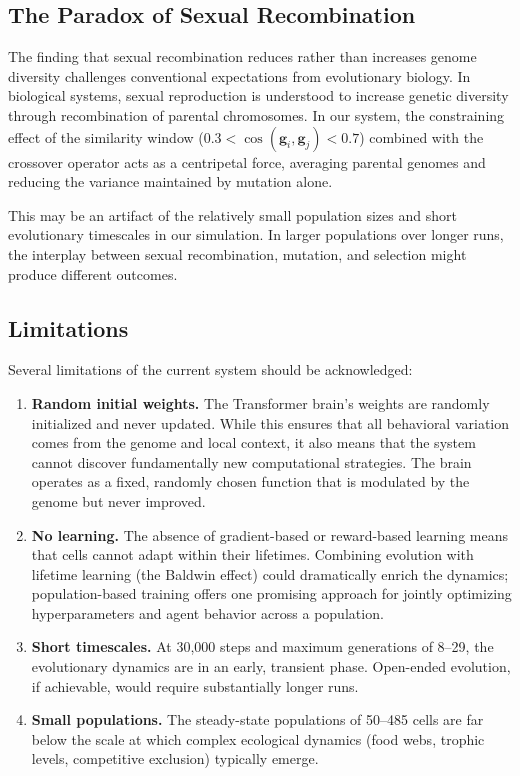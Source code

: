 \documentclass[10pt,twocolumn]{article}
\begin{document}
\subsection{The Paradox of Sexual Recombination}

The finding that sexual recombination reduces rather than increases genome diversity challenges conventional expectations from evolutionary biology.
In biological systems, sexual reproduction is understood to increase genetic diversity through recombination of parental chromosomes.
In our system, the constraining effect of the similarity window ($0.3 < \cos(\mathbf{g}_i, \mathbf{g}_j) < 0.7$) combined with the crossover operator acts as a centripetal force, averaging parental genomes and reducing the variance maintained by mutation alone.

This may be an artifact of the relatively small population sizes and short evolutionary timescales in our simulation.
In larger populations over longer runs, the interplay between sexual recombination, mutation, and selection might produce different outcomes.

\subsection{Limitations}

Several limitations of the current system should be acknowledged:

\begin{enumerate}
  \item \textbf{Random initial weights.} The Transformer brain's weights are randomly initialized and never updated.
  While this ensures that all behavioral variation comes from the genome and local context, it also means that the system cannot discover fundamentally new computational strategies.
  The brain operates as a fixed, randomly chosen function that is modulated by the genome but never improved.

  \item \textbf{No learning.} The absence of gradient-based or reward-based learning means that cells cannot adapt within their lifetimes.
  Combining evolution with lifetime learning (the Baldwin effect) could dramatically enrich the dynamics; population-based training \cite{jaderberg2017population} offers one promising approach for jointly optimizing hyperparameters and agent behavior across a population.

  \item \textbf{Short timescales.} At 30{,}000 steps and maximum generations of 8--29, the evolutionary dynamics are in an early, transient phase.
  Open-ended evolution, if achievable, would require substantially longer runs.

  \item \textbf{Small populations.} The steady-state populations of 50--485 cells are far below the scale at which complex ecological dynamics (food webs, trophic levels, competitive exclusion) typically emerge.
\end{enumerate}
\end{document}
